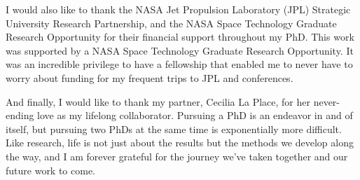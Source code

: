 I would also like to thank the NASA Jet Propulsion Laboratory (JPL) Strategic University Research Partnership, and the NASA Space Technology Graduate Research Opportunity for their financial support throughout my PhD. 
This work was supported by a NASA Space Technology Graduate Research Opportunity. 
It was an incredible privilege to have a fellowship that enabled me to never have to worry about funding for my frequent trips to JPL and conferences.

And finally, I would like to thank my partner, Cecilia La Place, for her never-ending love as my lifelong collaborator. 
Pursuing a PhD is an endeavor in and of itself, but pursuing two PhDs at the same time is exponentially more difficult.
Like research, life is not just about the results but the methods we develop along the way, and I am forever grateful for the journey we've taken together and our future work to come.
